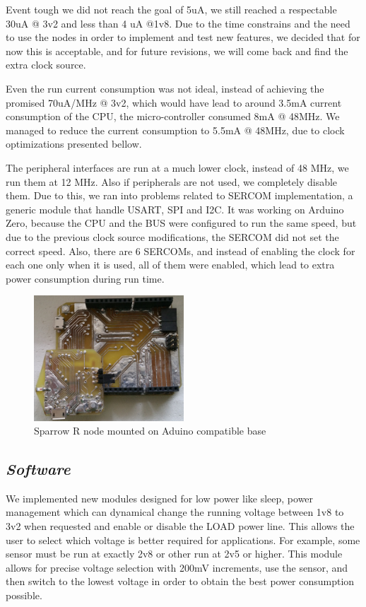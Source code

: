 Event tough we did not reach the goal of 5uA, we still reached a respectable 30uA @ 3v2 and less than 4 uA @1v8.
Due to the time constrains and the need to use the nodes in order to implement and test new
features, we decided that for now this is acceptable, and for future revisions, we will come back
and find the extra clock source.

Even the run current consumption was not ideal, instead of achieving the promised 70uA/MHz @ 3v2,
which would have lead to around 3.5mA current consumption of the CPU, the micro-controller
consumed 8mA @ 48MHz. We managed to reduce the current consumption to 5.5mA @ 48MHz, due to
clock optimizations presented bellow.

The peripheral interfaces are run at a much lower clock, instead of 48 MHz, we run them at 12 MHz.
Also if peripherals are not used, we completely disable them. Due to this, we ran into problems
related to SERCOM implementation, a generic module that handle USART, SPI and I2C. It was working
on Arduino Zero, because the CPU and the BUS were configured to run the same speed, but due to the
previous clock source modifications, the SERCOM did not set the correct speed. Also, there are 6
SERCOMs, and instead of enabling the clock for each one only when it is used, all of them were
enabled, which lead to extra power consumption during run time.

\begin{figure}[ht] \centering
\includegraphics[width=0.5\textwidth]{img/base-with-sensor.jpg}
\caption{Sparrow R node mounted on Aduino compatible base}
\end{figure}
\subsection{\textit{Software}}


We implemented new modules designed for low power like sleep, power management which can dynamical
change the running voltage between 1v8 to 3v2 when requested and enable or disable the LOAD power
line. This allows the user to select which voltage is better required for applications. For example,
some sensor must be run at exactly 2v8 or other run at 2v5 or higher. This module allows for
precise voltage selection with 200mV increments, use the sensor, and then switch to the lowest
voltage in order to obtain the best power consumption possible.

